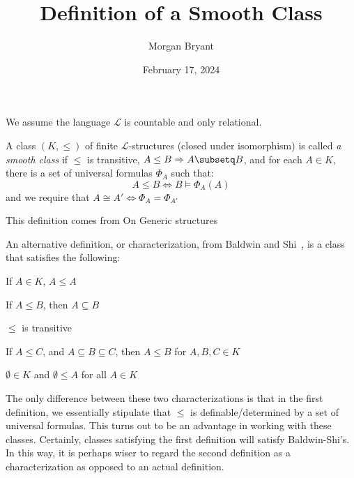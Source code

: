 \documentclass[a4paper]{article}
\title{Definition of a Smooth Class}
\date{February 17, 2024}
\author{Morgan Bryant}
\begin{document}
\maketitle
\par{We assume the language \(\mathcal {L}\) is countable and only relational.}\par{A class \((K, \leq )\) of finite \(\mathcal {L}\)-structures (closed under isomorphism) is called \emph{a smooth class} if \(\leq\) is transitive, \(A \leq  B  \Rightarrow  A \subsetq  B\), and for each \(A \in  K\), there is a set of universal formulas \(\Phi _A\) such that:
\[A \leq  B  \Leftrightarrow  B \models   \Phi _A(A)\]
and we require that \(A \cong  A'  \Leftrightarrow   \Phi _A =  \Phi _{A'}\)}\par{This definition comes from On Generic structures~\cite{Smc-r001}}\par{An alternative definition, or characterization, from Baldwin and Shi~\cite{Smc-r002}, is a class that satisfies the following:}\par{If \(A \in  K\), \(A \leq  A\)}\par{If \(A \leq  B\), then \(A \subseteq  B\)}\par{\(\leq\) is transitive}\par{If \(A \leq  C\), and \(A \subseteq  B \subseteq  C\), then \(A \leq  B\) for \(A,B,C  \in  K\)}\par{\(\emptyset \in  K\) and \(\emptyset   \leq  A\) for all \(A \in  K\)}\par{The only difference between these two characterizations is that in the first definition, we essentially stipulate that \(\leq\) is definable/determined by a 
set of universal formulas. This turns out to be an advantage in working with these classes. Certainly, classes satisfying the first definition will satisfy Baldwin-Shi's. In this way,
it is perhaps wiser to regard the second definition as a characterization as opposed to an actual definition.}
\printbibliography
\end{document}
